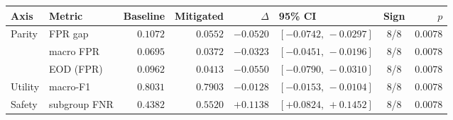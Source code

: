 \begin{tabular}{llrrrlcr}
\toprule
Axis & Metric & Baseline & Mitigated & $\Delta$ & 95\% CI & Sign & $p$ \\
\midrule
Parity & FPR gap & $0.1072$ & $0.0552$ & $-0.0520$ & $[-0.0742,\,-0.0297]$ & 8/8 & $0.0078$ \\
 & macro FPR & $0.0695$ & $0.0372$ & $-0.0323$ & $[-0.0451,\,-0.0196]$ & 8/8 & $0.0078$ \\
 & EOD (FPR) & $0.0962$ & $0.0413$ & $-0.0550$ & $[-0.0790,\,-0.0310]$ & 8/8 & $0.0078$ \\
\addlinespace
Utility & macro-F1 & $0.8031$ & $0.7903$ & $-0.0128$ & $[-0.0153,\,-0.0104]$ & 8/8 & $0.0078$ \\
\addlinespace
Safety & subgroup FNR & $0.4382$ & $0.5520$ & $+0.1138$ & $[+0.0824,\,+0.1452]$ & 8/8 & $0.0078$ \\
\bottomrule
\end{tabular}
